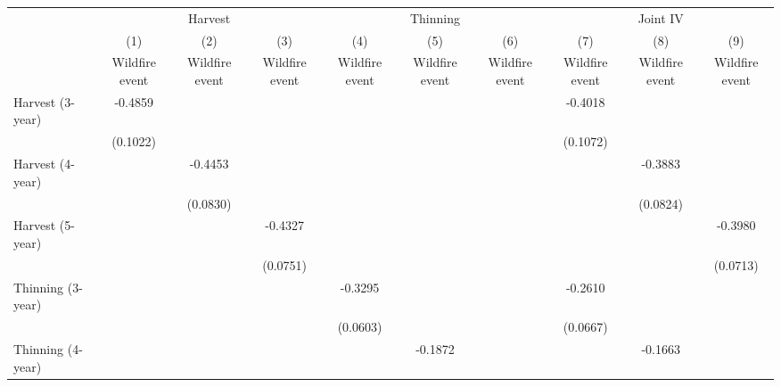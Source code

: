 \begin{tabular}{lccccccccc}
\toprule
& \multicolumn{3}{c}{Harvest} & \multicolumn{3}{c}{Thinning} & \multicolumn{3}{c}{Joint IV} \\
\cmidrule(lr){2-4}\cmidrule(lr){5-7}\cmidrule(lr){8-10}
& (1) & (2) & (3) & (4) & (5) & (6) & (7) & (8) & (9) \\
& Wildfire event & Wildfire event & Wildfire event & Wildfire event & Wildfire event & Wildfire event & Wildfire event & Wildfire event & Wildfire event \\
\midrule
Harvest (3-year)&  -0.4859\sym{***}&                  &                  &                  &                  &                  &  -0.4018\sym{***}&                  &                  \\
                & (0.1022)         &                  &                  &                  &                  &                  & (0.1072)         &                  &                  \\
\addlinespace
Harvest (4-year)&                  &  -0.4453\sym{***}&                  &                  &                  &                  &                  &  -0.3883\sym{***}&                  \\
                &                  & (0.0830)         &                  &                  &                  &                  &                  & (0.0824)         &                  \\
\addlinespace
Harvest (5-year)&                  &                  &  -0.4327\sym{***}&                  &                  &                  &                  &                  &  -0.3980\sym{***}\\
                &                  &                  & (0.0751)         &                  &                  &                  &                  &                  & (0.0713)         \\
\addlinespace
Thinning (3-year)&                  &                  &                  &  -0.3295\sym{***}&                  &                  &  -0.2610\sym{***}&                  &                  \\
                &                  &                  &                  & (0.0603)         &                  &                  & (0.0667)         &                  &                  \\
\addlinespace
Thinning (4-year)&                  &                  &                  &                  &  -0.1872\sym{***}&                  &                  &  -0.1663\sym{***}&                  \\

\end{tabular}
